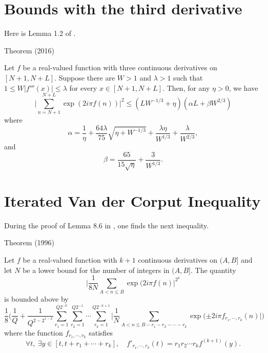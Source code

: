   
\par 
\section{Bounds with the third derivative}


Here is Lemma 1.2 of
\cite{Hiary*16}.
\par 
\begin{thm}{Theorem (2016)}

  Let $f$ be a real-valued function with three continuous derivatives
  on $[N+1, N+L]$. Suppose there are $W > 1$ and $\lambda > 1$ such
  that $1 \le W |f'''(x)| \le \lambda$ for every $x\in [N+1,
  N+L]$. Then, for any $\eta > 0$, we have
  $$
  \biggl|\sum_{n= N+1}^{N+L}
  \exp( 2i\pi f(n)) \biggr|^2
  \le (LW^{-1/3} +\eta) (\alpha L + \beta W^{2/3})
  $$
  where
  $$
  \alpha = \frac{1}{\eta} +\frac{64\lambda}{75}
  \sqrt{\eta + W^{-1/3}}+\frac{\lambda\eta}{W^{1/3}}
  +\frac{\lambda}{W^{2/3}},
  $$
  and
  $$
  \beta = \frac{65}{15\sqrt{\eta}} + \frac{3}{W^{1/3}}.
  $$
\end{thm}


  
\par 
\section{Iterated Van der Corput Inequality}


During the proof of Lemma 8.6 in 
  \cite{Granville-Ramare*96},
  one finds the next inequality.
\par 
\begin{thm}{Theorem (1996)}

  Let $f$ be a real-valued function with $k+1$ continuous derivatives
  on $(A, B]$ and let $N$ be a lower bound for the number of integers
  in $(A,B]$. The quantity
  $$
  \biggl|\frac{1}{8N}
  \sum_{A < n\le B} \exp(2 i \pi f(n)\biggr|^{2^k}
	    $$
	    is bounded above by
	    $$
	    \frac{1}{8}\biggl(
	    \frac{1}{Q} + \frac{1}{Q^{2-2^{1-k}}}
	    \sum_{r_1 =1}^{Q2^{-0}}
	    \sum_{r_2 =1}^{Q2^{-1}}
	    \cdots
	    \sum_{r_k =1}^{Q2^{-k+1}}
	    \biggl|
	    \frac{1}{N}
	    \sum_{A < n \le B-r_1-r_2-\cdots-r_k}
		    \exp(\pm 2i\pi f_{r_1,\cdots,r_k}(n)   
	    \biggr|
	    \biggr)
		      $$
		      where the function $f_{r_1,\cdots,r_k}$ satisfies
		      $$
		      \forall t,\ \exists y\in[t, t + r_1 + \cdots + r_k],
		      \quad
		      f'_{r_1,\cdots, r_k}(t) = r_1r_2\cdots r_k f^{(k+1)}(y).
		      $$
\end{thm}



